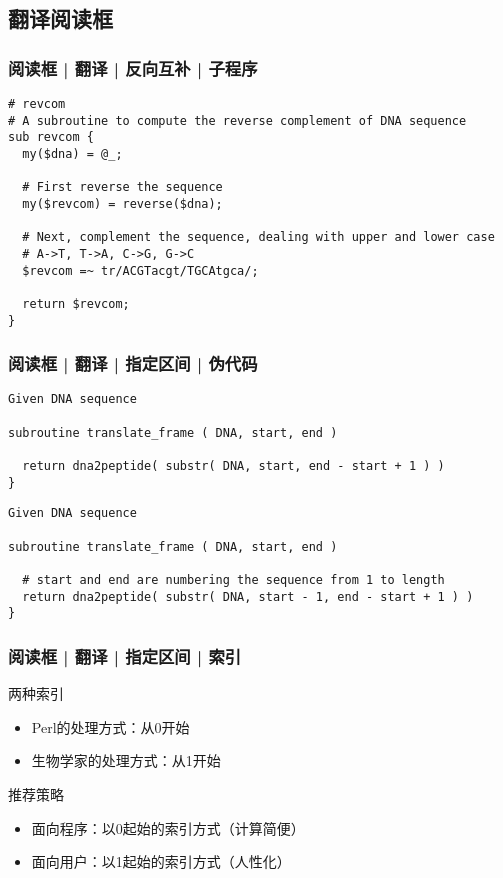 \subsection{翻译阅读框}
\begin{frame}[fragile]
  \frametitle{阅读框 | 翻译 | 反向互补 | 子程序}
  \vspace{-0.8em}
\begin{lstlisting}
# revcom 
# A subroutine to compute the reverse complement of DNA sequence
sub revcom {
  my($dna) = @_;

  # First reverse the sequence
  my($revcom) = reverse($dna);

  # Next, complement the sequence, dealing with upper and lower case
  # A->T, T->A, C->G, G->C
  $revcom =~ tr/ACGTacgt/TGCAtgca/;

  return $revcom;
}
\end{lstlisting}
\end{frame}

\begin{frame}[fragile]
  \frametitle{阅读框 | 翻译 | 指定区间 | 伪代码}
\begin{lstlisting}[basicstyle=\footnotesize\tt,numberstyle=\scriptsize]
Given DNA sequence

subroutine translate_frame ( DNA, start, end )

  return dna2peptide( substr( DNA, start, end - start + 1 ) )
}
\end{lstlisting}
\pause
\begin{lstlisting}[basicstyle=\footnotesize\tt,numberstyle=\scriptsize]
Given DNA sequence

subroutine translate_frame ( DNA, start, end )

  # start and end are numbering the sequence from 1 to length
  return dna2peptide( substr( DNA, start - 1, end - start + 1 ) )
}
\end{lstlisting}
\end{frame}

\begin{frame}[fragile]
  \frametitle{阅读框 | 翻译 | 指定区间 | \alert{索引}}
  \begin{block}{两种索引}
    \begin{itemize}
      \item Perl的处理方式：从0开始
      \item 生物学家的处理方式：从1开始
    \end{itemize}
  \end{block}
  \pause
  \begin{block}{推荐策略}
    \begin{itemize}
      \item 面向程序：以0起始的索引方式（计算简便）
      \item 面向用户：以1起始的索引方式（人性化）
    \end{itemize}
  \end{block}
\end{frame}

